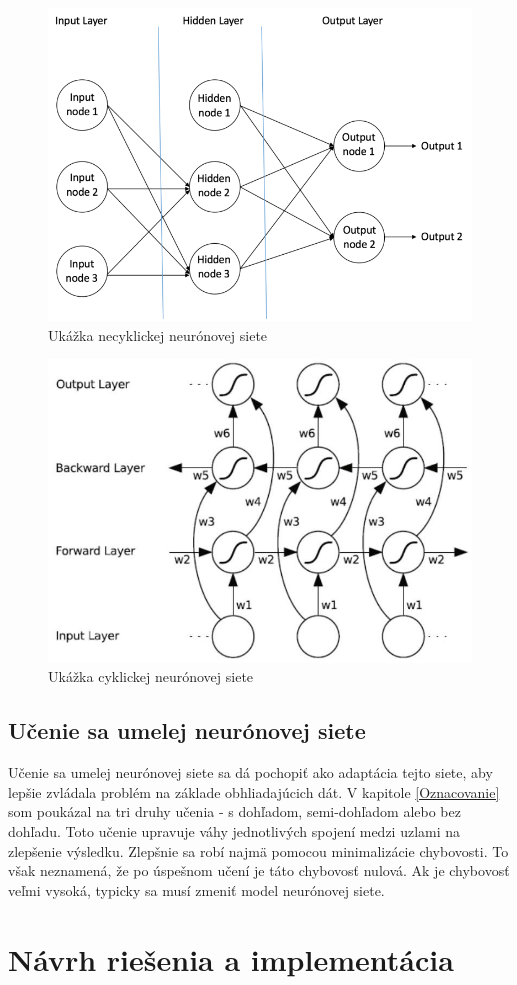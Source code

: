  \begin{figure}[!htb]
 \centering
 \includegraphics[width=0.5\linewidth]{obrazky-figures/feed_nw.png}
 \caption{Ukážka necyklickej neurónovej siete}

 \label{feed_n}
\end{figure}
 \begin{figure}[!htb]
 \centering
 \includegraphics[width=0.5\linewidth]{obrazky-figures/cyclic_g.png}
 \caption{Ukážka cyklickej neurónovej siete}
 \label{cyclic_n}
\end{figure}

\section{Učenie sa umelej neurónovej siete}
Učenie sa umelej neurónovej siete sa dá pochopiť ako adaptácia tejto siete, aby lepšie zvládala problém na základe obhliadajúcich dát. V kapitole \ref{Oznacovanie} som poukázal na tri druhy učenia - s dohľadom, semi-dohľadom alebo bez dohľadu. Toto učenie upravuje váhy jednotlivých spojení medzi uzlami na zlepšenie výsledku. Zlepšnie sa robí najmä pomocou minimalizácie chybovosti. To však neznamená, že po úspešnom učení je táto chybovosť nulová. Ak je chybovosť veľmi vysoká, typicky sa musí zmeniť model neurónovej siete. 






\chapter{Návrh riešenia a implementácia}
